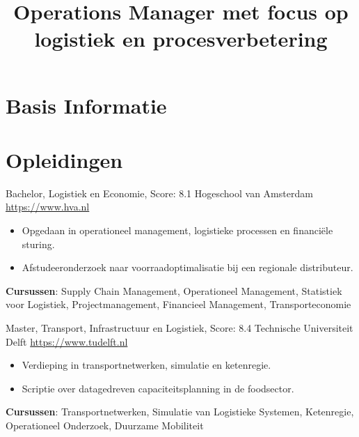 \documentclass[a4paper, serif, 10pt]{moderncv}
\title{Operations Manager met focus op logistiek en procesverbetering}
\begin{document}
\maketitle

\section{Basis Informatie}

\section{Opleidingen}

        {Bachelor, Logistiek en Economie, Score: 8.1}
        {Hogeschool van Amsterdam}
        {\url{https://www.hva.nl}}
        {}
        {\begin{itemize}
\item Opgedaan in operationeel management, logistieke processen en financiële sturing.
\item Afstudeeronderzoek naar voorraadoptimalisatie bij een regionale distributeur.
\end{itemize}
\textbf{Cursussen}: Supply Chain Management, Operationeel Management, Statistiek voor Logistiek, Projectmanagement, Financieel Management, Transporteconomie}

        {Master, Transport, Infrastructuur en Logistiek, Score: 8.4}
        {Technische Universiteit Delft}
        {\url{https://www.tudelft.nl}}
        {}
        {\begin{itemize}
\item Verdieping in transportnetwerken, simulatie en ketenregie.
\item Scriptie over datagedreven capaciteitsplanning in de foodsector.
\end{itemize}
\textbf{Cursussen}: Transportnetwerken, Simulatie van Logistieke Systemen, Ketenregie, Operationeel Onderzoek, Duurzame Mobiliteit}
\end{document}
